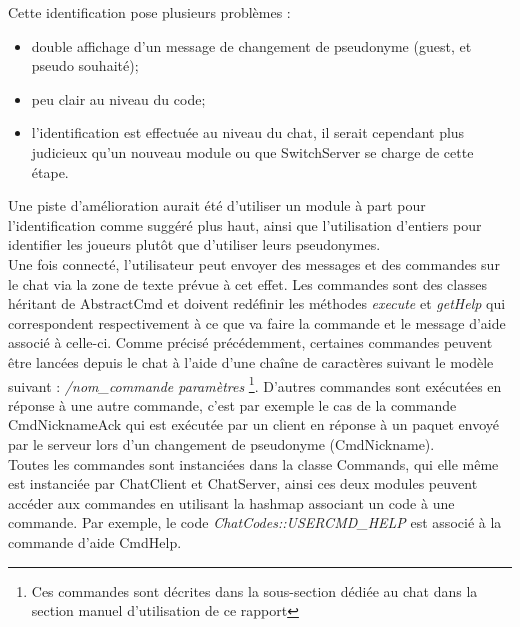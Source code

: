 Cette identification pose plusieurs problèmes :
\begin{itemize}
	\item double affichage d'un message de changement de pseudonyme (guest, et pseudo souhaité);
	\item peu clair au niveau du code;
	\item l'identification est effectuée au niveau du chat, il serait cependant plus judicieux qu'un nouveau module ou que SwitchServer se charge de cette étape.
\end{itemize}

Une piste d'amélioration aurait été d'utiliser un module à part pour l'identification comme suggéré plus haut, ainsi que l'utilisation d'entiers pour identifier les joueurs plutôt que d'utiliser leurs pseudonymes.\\

Une fois connecté, l'utilisateur peut envoyer des messages et des commandes sur le chat via la zone de texte prévue à cet effet. Les commandes sont des classes héritant de AbstractCmd et doivent redéfinir les méthodes \emph{execute} et \emph{getHelp} qui correspondent respectivement à ce que va faire la commande et le message d'aide associé à celle-ci. Comme précisé précédemment, certaines commandes peuvent être lancées depuis le chat à l'aide d'une chaîne de caractères suivant le modèle suivant : \emph{/nom\_commande paramètres} \footnote{Ces commandes sont décrites dans la sous-section dédiée au chat dans la section manuel d'utilisation de ce rapport}. D'autres commandes sont exécutées en réponse à une autre commande, c'est par exemple le cas de la commande CmdNicknameAck qui est exécutée par un client en réponse à un paquet envoyé par le serveur lors d'un changement de pseudonyme (CmdNickname).\\

Toutes les commandes sont instanciées dans la classe Commands, qui elle même est instanciée par ChatClient et ChatServer, ainsi ces deux modules peuvent accéder aux commandes en utilisant la hashmap associant un code à une commande. Par exemple, le code \emph{ChatCodes::USERCMD\_HELP} est associé à la commande d'aide CmdHelp.\\